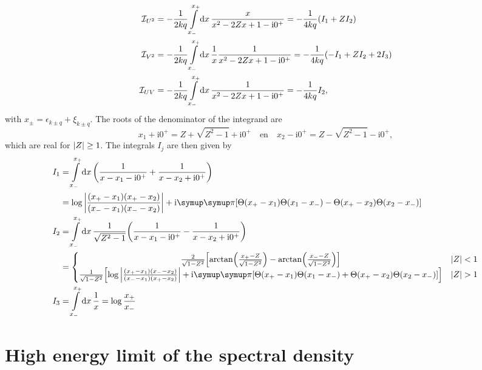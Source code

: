 \documentclass[10pt,a4paper]{article}
\let\canpi\pi
\renewcommand\pi{\symup\canpi}%
\newcommand{\ii}{\ensuremath{\mathrm{i}}}
\begin{document}
\begin{align}
    \mathcal{I}_{U^2} &
    = -\frac{1}{2kq} \int\limits_{x_-}^{x_+} \dd{x} \frac{x}{x^2-2Zx+1-\ii 0^+} 
    = -\frac{1}{4kq} \qty(I_1 + Z I_2)\\
    \mathcal{I}_{V^2} &
    = -\frac{1}{2kq} \int\limits_{x_-}^{x_+} \dd{x} \frac{1}{x} \frac{1}{x^2-2Zx+1-\ii 0^+} 
    = -\frac{1}{4kq} \qty(-I_1 + Z I_2 + 2 I_3)\\
    \mathcal{I}_{UV} &
    = -\frac{1}{2kq} \int\limits_{x_-}^{x_+} \dd{x} \frac{1}{x^2-2Zx+1-\ii 0^+}
    = -\frac{1}{4kq} I_2,
\end{align}
with $x_\pm = \epsilon_{k\pm q}+\xi_{k\pm q}$. The roots of the denominator of the integrand are
\begin{equation}
    x_1 + \ii 0^+ = Z + \sqrt{Z^2-1} + \ii 0^+ \quad \text{en} \quad 
    x_2 - \ii 0^+ = Z - \sqrt{Z^2-1} - \ii 0^+, 
\end{equation}
which are real for $\abs{Z}\geq 1$. The integrals $I_j$ are then given by
\begin{align}
    I_1 &= \int\limits_{x_-}^{x_+} \dd{x} \qty(
        \frac{1}{x-x_1-\ii 0^+} + \frac{1}{x-x_2+\ii 0^+}
    ) \\ &= \log \abs{
        \frac{(x_+-x_1)(x_+-x_2)}{(x_--x_1)(x_--x_2)}
    } +\ii \pi \qty[
        \Theta(x_+-x_1)\Theta(x_1-x_-)-\Theta(x_+-x_2)\Theta(x_2-x_-)
    ] \\
    I_2 &= \int\limits_{x_-}^{x_+} \dd{x} \frac{1}{\sqrt{Z^2-1}} \qty(
        \frac{1}{x-x_1-\ii 0^+} - \frac{1}{x-x_2+\ii 0^+}
    ) \\ &= \left\lbrace \mqty{
        \frac{2}{\sqrt{1-Z^2}} \qty[
            \arctan(\frac{x_+-Z}{\sqrt{1-Z^2}}) - \arctan(\frac{x_- -Z}{\sqrt{1-Z^2}})
        ] & \abs{Z} < 1 \\
        \frac{1}{\sqrt{1-Z^2}} \qty[
            \log \abs{
                \frac{(x_+-x_1)(x_--x_2)}{(x_--x_1)(x_+-x_2)}
            } +\ii \pi \qty[
                \Theta(x_+-x_1)\Theta(x_1-x_-)+\Theta(x_+-x_2)\Theta(x_2-x_-)
            ]
        ] & \abs{Z} > 1
    } \right. \\
    I_3 &= \int\limits_{x_-}^{x_+} \dd{x} \frac{1}{x} 
    = \log \frac{x_+}{x_-}
\end{align}

\section{High energy limit of the spectral density}
\end{document}
